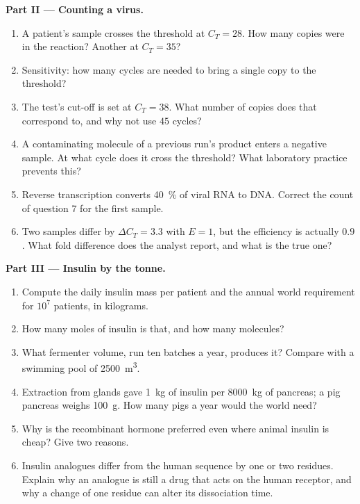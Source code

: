 \begin{problem}
\medskip
\noindent\textbf{Part II --- Counting a virus.}
\begin{enumerate}[resume]
  \item A patient's sample crosses the threshold at $C_{T} = 28$. How
        many copies were in the reaction? Another at $C_{T} = 35$?
  \item Sensitivity: how many cycles are needed to bring a single copy
        to the threshold?
  \item The test's cut-off is set at $C_{T} = 38$. What number of
        copies does that correspond to, and why not use $45$ cycles?
  \item A contaminating molecule of a previous run's product enters a
        negative sample. At what cycle does it cross the threshold?
        What laboratory practice prevents this?
  \item Reverse transcription converts \qty{40}{\%} of viral RNA to
        DNA. Correct the count of question 7 for the first sample.
  \item Two samples differ by $\Delta C_{T} = 3.3$ with $E = 1$, but
        the efficiency is actually $0.9$. What fold difference does the
        analyst report, and what is the true one?
\end{enumerate}

\medskip
\noindent\textbf{Part III --- Insulin by the tonne.}
\begin{enumerate}[resume]
  \item Compute the daily insulin mass per patient and the annual
        world requirement for $10^{7}$ patients, in kilograms.
  \item How many moles of insulin is that, and how many molecules?
  \item What fermenter volume, run ten batches a year, produces it?
        Compare with a swimming pool of \qty{2500}{m^3}.
  \item Extraction from glands gave \qty{1}{kg} of insulin per
        \qty{8000}{kg} of pancreas; a pig pancreas weighs
        \qty{100}{g}. How many pigs a year would the world need?
  \item Why is the recombinant hormone preferred even where animal
        insulin is cheap? Give two reasons.
  \item Insulin analogues differ from the human sequence by one or two
        residues. Explain why an analogue is still a drug that acts on
        the human receptor, and why a change of one residue can alter
        its dissociation time.
\end{enumerate}


\end{problem}
